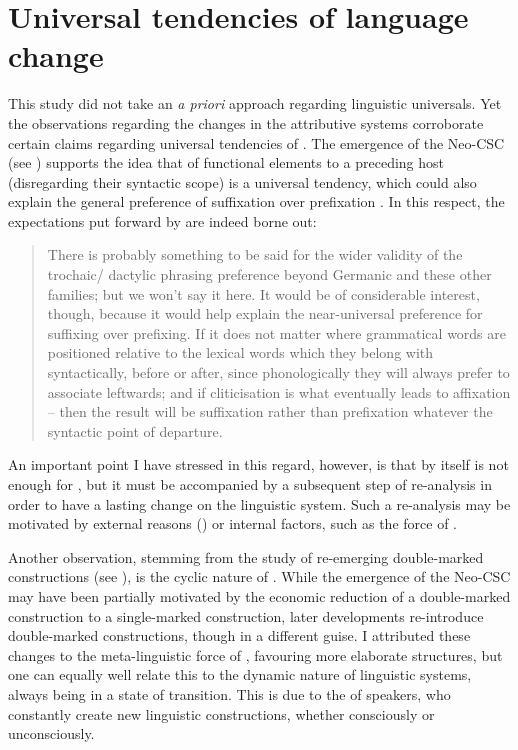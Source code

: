 \section{Universal tendencies of language change} \label{ss:universal_language_change}

This study did not take an \emph{a priori} approach regarding linguistic universals. Yet the observations regarding the changes in the  attributive systems corroborate certain claims regarding universal tendencies of . The emergence of the Neo-CSC  (see ) supports the idea that  of functional elements to a preceding host (disregarding their syntactic scope) is  a universal tendency, which  could also explain the general preference of suffixation over prefixation \citep[cf.][]{DryerAffix}. In this respect, the expectations put forward by \citeauthor{LahiriPlank} are indeed borne out: \blockquote[{\cite[395]{LahiriPlank}}]{There is probably something to be said for the wider validity of the trochaic/ dactylic
phrasing preference beyond Germanic and these other families; but we won’t say it here. It
would be of considerable interest, though, because it would help explain the near-universal
preference for suffixing over prefixing. If it does not matter where grammatical words are
positioned relative to the lexical words which they belong with syntactically, before or after,
since phonologically they will always prefer to associate leftwards; and if cliticisation is what
eventually leads to affixation -- then the result will be suffixation rather than prefixation
whatever the syntactic point of departure.}

An important point I have stressed in this regard, however, is that  by itself is not enough for , but it must be accompanied by a subsequent step of re-analysis in order to have a lasting change on the linguistic system. Such a re-analysis may be motivated by external reasons () or internal factors, such as the force of .

Another observation, stemming from the study of re-emerging double-marked constructions (see ), is the cyclic nature of . While the emergence of the Neo-CSC may have been partially motivated by the economic reduction of a double-marked construction to a single-marked construction, later developments re-introduce double-marked constructions, though in a different guise. I attributed these changes to the meta-linguistic force of , favouring more elaborate structures, but one can equally well relate this to the dynamic nature of linguistic systems, always being in a state of transition. This is due to the  of speakers, who constantly create new linguistic constructions, whether consciously or unconsciously. 



